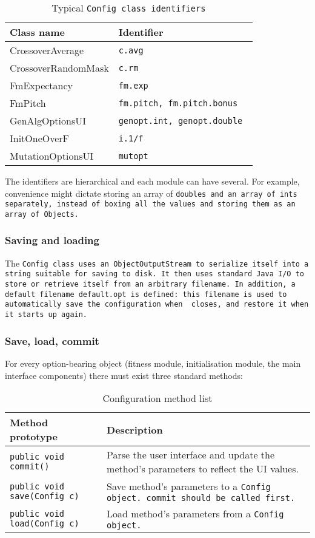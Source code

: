\begin{table}[ht]
	\caption{Typical \tt{Config} class identifiers}
	\centering
	\begin{tabular}{l l}
	\hline\hline
	Class name & Identifier \\ [0.5ex]
	\hline
	CrossoverAverage & \tt{c.avg} \\
	CrossoverRandomMask & \tt{c.rm} \\
	FmExpectancy & \tt{fm.exp} \\
	FmPitch & \tt{fm.pitch}, \tt{fm.pitch.bonus} \\
	GenAlgOptionsUI & \tt{genopt.int}, \tt{genopt.double} \\
	InitOneOverF & \tt{i.1/f} \\
	MutationOptionsUI & \tt{mutopt} \\ [1ex]
	\hline
	\end{tabular}
	\label{tbl-config-keys}
\end{table}

The identifiers are hierarchical and each module can have several. For example, convenience might dictate storing an array of \tt{double}s and an array of \tt{int}s separately, instead of boxing all the values and storing them as an array of \tt{Object}s.

\subsubsection{Saving and loading}

The \tt{Config} class uses an \tt{ObjectOutputStream} to serialize itself into a string suitable for saving to disk. It then uses standard Java I/O to store or retrieve itself from an arbitrary filename. In addition, a default filename \tt{default.opt} is defined: this filename is used to automatically save the configuration when \jg\ closes, and restore it when it starts up again.

\subsubsection{Save, load, commit}

For every option-bearing object (fitness module, initialisation module, the main interface components) there must exist three standard methods:

\begin{table}[H]
	\caption{Configuration method list}
	\centering
	\begin{tabular}{l p{10cm}}
	\hline\hline
	Method prototype & Description \\ [0.5ex]
	\hline
	\lstinline!public void commit()!       & Parse the user interface and update the method's parameters to reflect the UI values. \\
	\lstinline!public void save(Config c)! & Save method's parameters to a \tt{Config} object.\ \tt{commit} should be called first. \\
	\lstinline!public void load(Config c)! & Load method's parameters from a \tt{Config} object. \\ [1ex]
	\hline
	\end{tabular}
	\label{tbl-config-methods}
\end{table}

